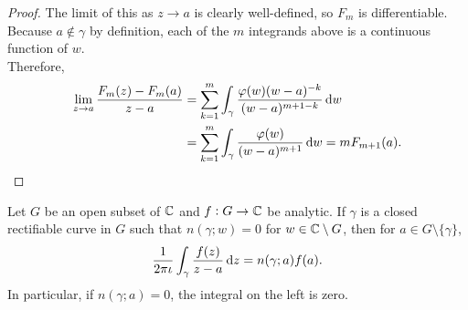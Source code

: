 \begin{proof}
		The limit of this as $z\to a$ is clearly well-defined, so $F_m$ is differentiable. Because $a\not\in\gamma$ by definition, each of the $m$ integrands above is a continuous function of $w$.\\
		Therefore,
		\begin{align*}
			\lim_{z\to a} \frac{F_m(z) - F_m(a)}{z-a} &= \sum_{k=1}^m \int_\gamma \frac{\varphi(w)(w-a)^{-k}}{(w-a)^{m+1-k}} \dif w \\
				&= \sum_{k=1}^m \int_\gamma \frac{\varphi(w)}{(w-a)^{m+1}} \dif w = m F_{m+1}(a). \qedhere
		\end{align*}
	\end{proof}

	\begin{ftheo}
		\label{cauchy integral formula v1}
		Let $G$ be an open subset of $\mathbb{C}$ and $f : G \to \mathbb{C}$ be analytic. If $\gamma$ is a closed rectifiable curve in $G$ such that $n(\gamma;w) = 0$ for $w \in \mathbb{C}\setminus G$, then for $a \in G\setminus\{\gamma\}$,
		\[ \frac{1}{2\pi\iota} \int_\gamma \frac{f(z)}{z-a} \dif z = n(\gamma;a) f(a). \]
		In particular, if $n(\gamma;a) = 0$, the integral on the left is zero.
	\end{ftheo}

